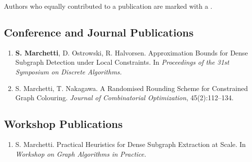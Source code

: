 Authors who equally contributed to a publication are marked with a \textdagger.

\subsection{Conference and Journal Publications}

\begin{enumerate}
	\item \textbf{S. Marchetti}\ec, D. Ostrowski\ec, R. Halvorsen. Approximation Bounds for Dense Subgraph Detection under Local Constraints. In \textit{Proceedings of the 31st Symposium on Discrete Algorithms.}
	\item S. Marchetti, T. Nakagawa. A Randomised Rounding Scheme for Constrained Graph Colouring. \textit{Journal of Combinatorial Optimization}, 45(2):112--134.
	\setcounter{publicationCounter}{\value{enumi}}	%
\end{enumerate}

\subsection{Workshop Publications}
\begin{enumerate}
	\setcounter{enumi}{\value{publicationCounter}}	%
	\item S. Marchetti. Practical Heuristics for Dense Subgraph Extraction at Scale. In \textit{Workshop on Graph Algorithms in Practice.}
	\setcounter{publicationCounter}{\value{enumi}}	%
\end{enumerate}
